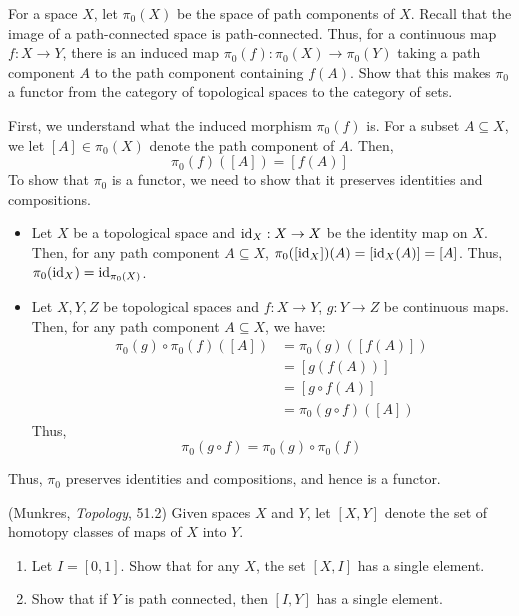 \documentclass[12pt]{article}
\begin{document}
\begin{problem}{5}
For a space $X$, let $\pi_0(X)$ be the space of path components of $X$. Recall that the image of a path-connected space is path-connected. Thus, for a continuous map $f: X \to Y$, there is an induced map $\pi_0(f): \pi_0(X) \to \pi_0(Y)$ taking a path component $A$ to the path component containing $f(A)$. Show that this makes $\pi_0$ a functor from the category of topological spaces to the category of sets.
\end{problem}

\begin{solution}
    First, we understand what the induced morphism $\pi_0(f)$ is. For a subset $A \subseteq X$, we let $[A] \in \pi_0(X)$ denote the path component of $A$. Then,
    \[ \pi_0(f)([A]) = [f(A)] \]   
    To show that $\pi_0$ is a functor, we need to show that it preserves identities and compositions.
    \begin{itemize}
        \item Let $X$ be a topological space and $\operatorname{id}_X : X \to X$ be the identity map on $X$. Then, for any path component $A\subseteq X$, $\pi_0([\operatorname{id}_X])(A) = [\operatorname{id}_X(A)] = [A]$. Thus, $\pi_0(\operatorname{id}_X) = \operatorname{id}_{\pi_0(X)}$.
        \item Let $X, Y, Z$ be topological spaces and $f: X \to Y$, $g: Y \to Z$ be continuous maps. Then, for any path component $A \subseteq X$, we have: 
        \begin{align*}
            \pi_0(g) \circ \pi_0(f)([A]) &= \pi_0(g)([f(A)]) \\
            &= [g(f(A))] \\
            &= [g \circ f(A)] \\
            &= \pi_0(g \circ f)([A])
        \end{align*}
        Thus, 
        \[ \pi_0(g \circ f) = \pi_0(g) \circ \pi_0(f) \]
    \end{itemize}
    Thus, $\pi_0$ preserves identities and compositions, and hence is a functor.
\end{solution}
\newpage

\begin{problem}{6} (Munkres, \emph{Topology}, 51.2) Given spaces $X$ and $Y$, let $[X,Y]$ denote the set of homotopy classes of maps of $X$ into $Y$.
\begin{enumerate}
\item Let $I = [0,1]$. Show that for any $X$, the set $[X,I]$ has a single element.
\item Show that if $Y$ is path connected, then $[I,Y]$ has a single element.
\end{enumerate}
\end{problem}
\end{document}
